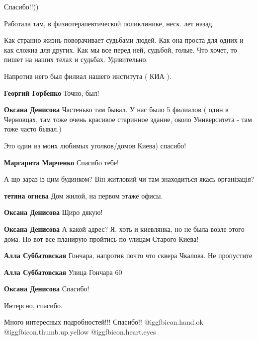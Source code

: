 \begin{itemize}
Спасибо!!))

Работала там, в физиотерапевтической поликлинике, неск. лет назад.


Как странно жизнь поворачивает судьбами людей. Как она проста для одних и как
сложна для других. Как мы все перед ней, судьбой, голые. Что хочет, то
пишет на наших телах и судьбах. Удивительно.


Напротив него был филиал нашего института ( КИА ).

\begin{itemize} %
\textbf{Георгий Горбенко} Точно, был!

\textbf{Оксана Денисова} Частенько там бывал. У нас было 5 филиалов ( один в Черновцах, там тоже очень красивое старинное здание, около Университета - там тоже часто бывал.)
\end{itemize} %

Это один из моих любимых уголков/домов Киева) спасибо!

\textbf{Маргарита Марченко} Спасибо тебе!

А що зараз із цим будинком?
Він житловий чи там знаходиться якась організація?

\begin{itemize} %
\textbf{тетяна огнєва} Дом жилой, на первом этаже офисы.

\textbf{Оксана Денисова} Щиро дякую!

\textbf{Оксана Денисова} А какой адрес? Я, хоть и киевлянка, но не была возле этого дома. Но вот все планирую пройтись по улицам Старого Киева!

\textbf{Алла Суббатовская} Гончара, напротив почто что сквера Чкалова. Не пропустите

\textbf{Алла Суббатовская} Улица Гончара 60

\textbf{Оксана Денисова} Спасибо!
\end{itemize} %

Интерсно, спасибо.

Много интересных подробностей!!! Спасибо!!  @igg{fbicon.hand.ok}  @igg{fbicon.thumb.up.yellow}  @igg{fbicon.heart.eyes} 


\end{itemize}

